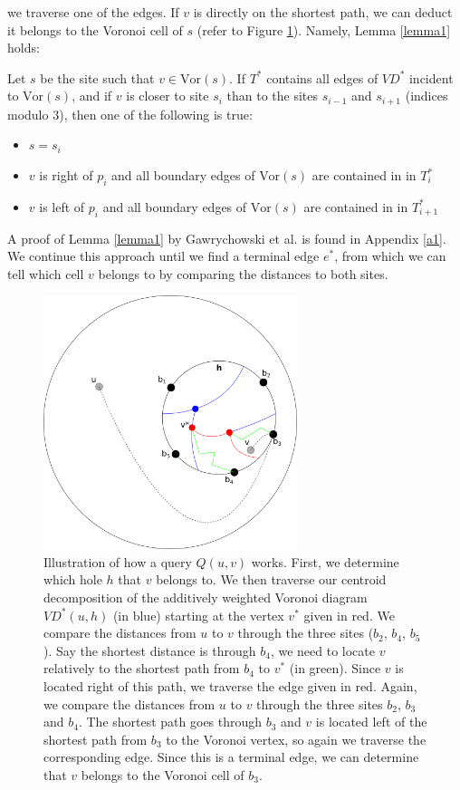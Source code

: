 we traverse one of the edges. If $v$ is directly on the shortest path, we can
deduct it belongs to the Voronoi cell of $s$ (refer to Figure \ref{vd1}). Namely, Lemma
\ref{lemma1} holds:
\begin{lemma}\label{lemma1}
  Let $s$ be the site such that $v\in \text{Vor}(s)$. If $T^*$ contains all edges of
  $VD^*$ incident to $\text{Vor}(s)$, and if $v$ is closer to site $s_i$ than to the
  sites $s_{i-1}$ and $s_{i+1}$ (indices modulo $3$), then one of the following is true:
  \begin{itemize}
    \item $s=s_i$
    \item $v$ is right of $p_i$ and all boundary edges of $\text{Vor}(s)$ are contained
      in in $T_i^*$
    \item $v$ is left of $p_i$ and all boundary edges of $\text{Vor}(s)$ are contained
      in in $T_{i+1}^*$
  \end{itemize}
\end{lemma}
\noindent A proof of Lemma \ref{lemma1} by Gawrychowski et al. \cite{gawrychowski2017better} is
found in Appendix \ref{a1}. \\
We continue this approach until we find a
terminal edge $e^*$, from which we can tell which cell $v$ belongs to by comparing the
distances to both sites.

\begin{figure}[h!]
  \centering
  \includegraphics[width=0.66\textwidth]{figs/vd1.pdf}
  \caption{Illustration of how a query $Q(u,v)$ works. First, we determine which hole $h$
    that $v$
  belongs to. We then traverse our centroid decomposition of the
  additively weighted Voronoi diagram $VD^*(u,h)$ (in blue) starting at the vertex $v^*$ given in
red. We compare the distances from $u$ to $v$ through the three sites ($b_2$, $b_4$,
$b_5$). Say the shortest distance is through $b_4$, we need to locate $v$ relatively to
the shortest path from $b_4$ to $v^*$ (in green). Since $v$ is
located right of this path, we traverse the edge given in red. Again, we compare the
distances from $u$ to $v$ through the three sites $b_2$, $b_3$ and $b_4$. The shortest
path goes through $b_3$ and $v$ is located left of the shortest path from $b_3$ to the
Voronoi vertex, so again we traverse the corresponding edge. Since this is a terminal
edge, we can determine that $v$ belongs to the Voronoi cell of $b_3$.}
    \label{vd1}
\end{figure}

